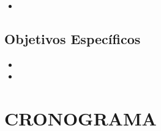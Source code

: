 \documentclass[12pt,openright,oneside,a4paper,ruledheader,pnumromarab,english]{abntex2}
\begin{document}
\begin{itemize}
    \item 
\end{itemize}

\subsection{Objetivos Específicos}

    \begin{itemize}
        \item 

        \item 
\end{itemize}

\section{CRONOGRAMA}
\end{document}
